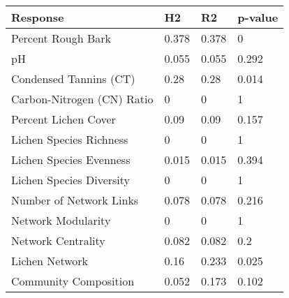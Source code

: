 \begin{table}[ht]
\centering
\begin{tabular}{llll}
  \hline
Response & H2 & R2 & p-value \\ 
  \hline
Percent Rough Bark & 0.378 & 0.378 & 0 \\ 
  pH & 0.055 & 0.055 & 0.292 \\ 
  Condensed Tannins (CT) & 0.28 & 0.28 & 0.014 \\ 
  Carbon-Nitrogen (CN) Ratio & 0 & 0 & 1 \\ 
  Percent Lichen Cover & 0.09 & 0.09 & 0.157 \\ 
  Lichen Species Richness & 0 & 0 & 1 \\ 
  Lichen Species Evenness & 0.015 & 0.015 & 0.394 \\ 
  Lichen Species Diversity & 0 & 0 & 1 \\ 
  Number of Network Links & 0.078 & 0.078 & 0.216 \\ 
  Network Modularity & 0 & 0 & 1 \\ 
  Network Centrality & 0.082 & 0.082 & 0.2 \\ 
  Lichen Network & 0.16 & 0.233 & 0.025 \\ 
  Community Composition & 0.052 & 0.173 & 0.102 \\ 
   \hline
\end{tabular}
\end{table}
